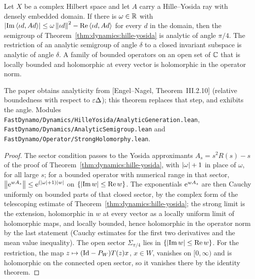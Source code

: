 \begin{theorem}
  \label{thm:dynamics:analytic-generation}
  \leanok
  Let $X$ be a complex Hilbert space and let $A$ carry a Hille--Yosida ray with densely
  embedded domain.  If there is $\omega\in\mathbb{R}$ with
  $\left\lvert\operatorname{Im}\left\langle\iota d,Ad\right\rangle\right\rvert\leq\omega\left\|\iota d\right\|^2-\operatorname{Re}\left\langle\iota d,Ad\right\rangle$ for every
  $d$ in the domain, then the semigroup of Theorem~\ref{thm:dynamics:hille-yosida} is analytic
  of angle $\pi/4$.  The restriction of an analytic semigroup of angle $\delta$ to a closed
  invariant subspace is analytic of angle $\delta$.  A family of bounded operators on an open
  set of $\mathbb{C}$ that is locally bounded and holomorphic at every vector is holomorphic in the
  operator norm.
\end{theorem}

The paper obtains analyticity from [Engel--Nagel, Theorem~III.2.10] (relative boundedness with
respect to $\varepsilon\Delta$); this theorem replaces that step, and exhibits the angle.  Modules
\texttt{FastDynamo/Dynamics/HilleYosida/AnalyticGeneration.lean},
\texttt{FastDynamo/Dynamics/AnalyticSemigroup.lean} and
\texttt{FastDynamo/Operator/StrongHolomorphy.lean}.

\begin{proof}
  \leanok
  The sector condition passes to the Yosida approximants $A_s=s^2R(s)-s$ of the proof of
  Theorem~\ref{thm:dynamics:hille-yosida}, with $\left\lvert\omega\right\rvert+1$ in place of $\omega$, for all
  large $s$; for a bounded operator with numerical range in that sector,
  $\left\|\mathrm{e}^{wA_s}\right\|\leq\mathrm{e}^{(\left\lvert\omega\right\rvert+1)\left\lvert w\right\rvert}$ on $\{\left\lvert\operatorname{Im} w\right\rvert\leq\operatorname{Re} w\}$.  The
  exponentials $\mathrm{e}^{wA_s}$ are then Cauchy uniformly on bounded parts of that closed sector, by
  the complex form of the telescoping estimate of Theorem~\ref{thm:dynamics:hille-yosida}; the
  strong limit is the extension, holomorphic in $w$ at every vector as a locally uniform limit
  of holomorphic maps, and locally bounded, hence holomorphic in the operator norm by the
  last statement (Cauchy estimates for the first two derivatives and the mean value
  inequality).  The open sector $\Sigma_{\pi/4}$ lies in $\{\left\lvert\operatorname{Im} w\right\rvert\leq\operatorname{Re} w\}$.  For the
  restriction, the map $z\mapsto(\mathrm{Id}-P_W)T(z)x$, $x\in W$, vanishes on $[0,\infty)$ and is
  holomorphic on the connected open sector, so it vanishes there by the identity theorem.
\end{proof}

